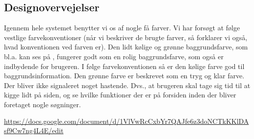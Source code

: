\subsection{Designovervejelser}
\label{subsec:designovervejelser}

Igennem hele systemet benytter vi os af nogle få farver. Vi har forsøgt at følge vestlige farvekonventioner\cite[p. ~344]{deb} (når vi beskriver de brugte farver, så forklarer vi også, hvad konventionen ved farven er). Den lidt kølige og grønne baggrundsfarve, som bl.a. kan ses på , fungerer godt som en rolig baggrundsfarve, som også er indbydende for brugeren. I følge farvekonventionen så er den kølige farve god til baggrundsinformation. Den grønne farve er beskrevet som en tryg og klar farve. Der bliver ikke signaleret noget hastende. Dvs., at brugeren skal tage sig tid til at kigge lidt på siden, og se hvilke funktioner der er på forsiden inden der bliver foretaget nogle søgninger.




\url{https://docs.google.com/document/d/1VlVwRcCxbYr7QAJfe6z3doNCTkKKlDAsf9Cw7ng4L4E/edit}